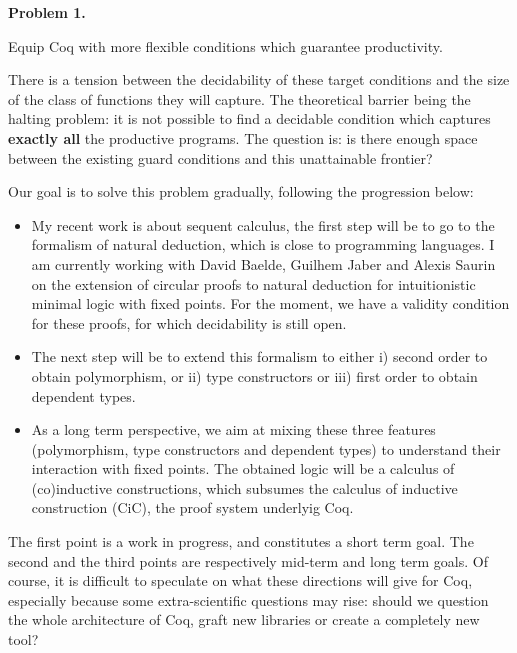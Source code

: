 \documentclass[11pt,twocolumn]{article}
\begin{document}
\begin{center}
\begin{bclogo}[logo= ,arrondi = 0.1, couleur = green!10,  epBarre = 0]{}
  \vspace{-10pt}
  \textbf{Problem 1.}

  Equip Coq with more flexible conditions which guarantee productivity.
\end{bclogo}
\end{center}
There is a tension  between the decidability of these target conditions and the size of the class of functions they will capture. The theoretical barrier being the halting problem:
it is not possible to find a decidable condition which captures \textbf{exactly all} the productive programs. The question is: is there enough space between the existing guard conditions and this unattainable frontier?

\smallskip
Our goal is to solve this problem gradually, following the progression below:
\begin{itemize}
\item My recent work is about sequent calculus, the first step will be to go to the formalism of natural deduction, which is close to programming languages. I am currently working with
David Baelde, Guilhem Jaber and Alexis Saurin on the extension of circular proofs to natural deduction for intuitionistic minimal logic with fixed points. For the moment, we have a validity condition  for these proofs, for which decidability is still open.


\item The next step will be to extend this formalism to either  i) second order to obtain polymorphism, or ii) type constructors or iii) first order to obtain dependent types.

\item As a long term perspective, we aim at mixing these three features (polymorphism, type constructors and dependent types) to understand their interaction with fixed points. The obtained logic will be a calculus of (co)inductive constructions, which subsumes the calculus of inductive construction (CiC), the proof system underlyig Coq.
  \end{itemize}


\smallskip
The first point is a work in progress, and constitutes a short term goal. The second and the third points are respectively mid-term and long term goals. Of course, it is difficult to speculate on what these directions will give for Coq, especially because some extra-scientific questions may rise: should we question the whole architecture of Coq, graft new libraries or create a completely new tool?
\end{document}
